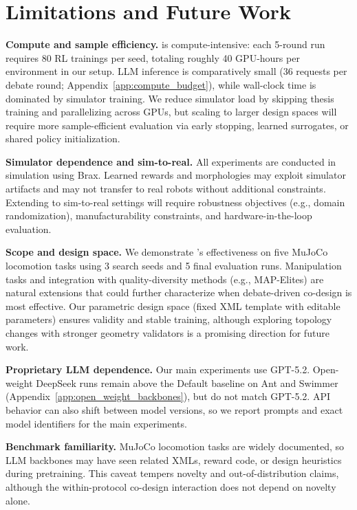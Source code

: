\section{Limitations and Future Work}
\label{sec:limitations}

\textbf{Compute and sample efficiency.} \abbrev{} is compute-intensive: each 5-round run requires 80 RL trainings per seed, totaling roughly 40 GPU-hours per environment in our setup. LLM inference is comparatively small (36 requests per debate round; Appendix~\ref{app:compute_budget}), while wall-clock time is dominated by simulator training. We reduce simulator load by skipping thesis training and parallelizing across GPUs, but scaling to larger design spaces will require more sample-efficient evaluation via early stopping, learned surrogates, or shared policy initialization.

\textbf{Simulator dependence and sim-to-real.} All experiments are conducted in simulation using Brax. Learned rewards and morphologies may exploit simulator artifacts and may not transfer to real robots without additional constraints. Extending \abbrev{} to sim-to-real settings will require robustness objectives (e.g., domain randomization), manufacturability constraints, and hardware-in-the-loop evaluation.

\textbf{Scope and design space.} We demonstrate \abbrev{}'s effectiveness on five MuJoCo locomotion tasks using 3 search seeds and 5 final evaluation runs. Manipulation tasks and integration with quality-diversity methods (e.g., MAP-Elites) are natural extensions that could further characterize when debate-driven co-design is most effective. Our parametric design space (fixed XML template with editable parameters) ensures validity and stable training, although exploring topology changes with stronger geometry validators is a promising direction for future work.

\textbf{Proprietary LLM dependence.} Our main experiments use GPT-5.2. Open-weight DeepSeek runs remain above the Default baseline on Ant and Swimmer (Appendix~\ref{app:open_weight_backbones}), but do not match GPT-5.2. API behavior can also shift between model versions, so we report prompts and exact model identifiers for the main experiments.

\textbf{Benchmark familiarity.} MuJoCo locomotion tasks are widely documented, so LLM backbones may have seen related XMLs, reward code, or design heuristics during pretraining. This caveat tempers novelty and out-of-distribution claims, although the within-protocol co-design interaction does not depend on novelty alone.

